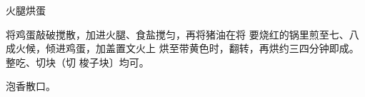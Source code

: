 \begin{recipe}{火腿烘蛋}

\ingredients


\cooking

将鸡蛋敲破搅散，加进火腿、食盐搅匀，再将猪油在将 要烧红的锅里煎至七、八成火候，倾进鸡蛋，加盖置文火上 烘至带黄色时，翻转，再烘约三四分钟即成。整吃、切块（切 梭子块〕均可。

\notes

泡香散口。

\end{recipe}

